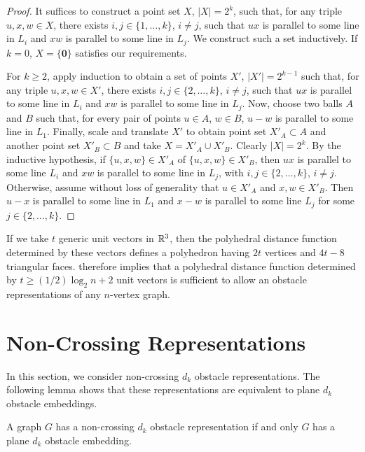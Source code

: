 \documentclass{patmorin}
\begin{document}
\begin{proof}
   It suffices to construct a point set $X$, $|X|=2^{k}$, such that,
   for any triple $u,x,w\in X$, there exists $i,j\in\{1,\ldots,k\}$,
   $i\neq j$, such that $ux$ is parallel to some line in $L_i$ and $xw$ is
   parallel to some line in $L_j$.  We construct such a set inductively.
   If $k=0$, $X=\{\textbf{0}\}$ satisfies our requirements.

   For $k\ge 2$, apply induction to obtain a set of points $X'$,
   $|X'|=2^{k-1}$ such that, for any triple $u,x,w\in X'$, there exists
   $i,j\in\{2,\ldots,k\}$, $i\neq j$, such that $ux$ is parallel to
   some line in $L_i$ and $xw$ is parallel to some line in $L_j$.  Now,
   choose two balls $A$ and $B$ such that, for every pair of points
   $u\in A$, $w\in B$, $u-w$ is parallel to some line in $L_{1}$.
   Finally, scale and translate $X'$ to obtain point set $X'_A\subset
   A$ and another point set $X'_B\subset B$ and take $X=X'_A\cup X'_B$.
   Clearly $|X|=2^k$.  By the inductive hypothesis, if $\{u,x,w\}\in X'_A$
   of $\{u,x,w\}\in X'_B$, then $ux$ is parallel to some line $L_i$ and
   $xw$ is parallel to some line in $L_j$, with $i,j\in\{2,\ldots,k\}$,
   $i\neq j$.  Otherwise, assume without loss of generality that $u\in
   X'_A$ and $x,w\in X'_B$.  Then $u-x$ is parallel to some line in $L_1$
   and $x-w$ is parallel to some line $L_j$ for some $j\in\{2,\ldots,k\}$.
\end{proof}

If we take $t$ generic unit vectors in $\mathbb{R}^3$, then the polyhedral
distance function determined by these vectors defines a polyhedron having
$2t$ vertices and $4t-8$ triangular faces.  
therefore implies that a polyhedral distance function determined by
$t\ge (1/2)\log_2 n +2$ unit vectors is sufficient to allow an obstacle
representations of any $n$-vertex graph.



\section{Non-Crossing Representations}

In this section, we consider non-crossing $d_k$ obstacle
representations. The following lemma shows that these representations
are equivalent to plane $d_k$ obstacle embeddings.

\begin{lem}
   A graph $G$ has a non-crossing $d_k$ obstacle representation if and
   only $G$ has a plane $d_k$ obstacle embedding.
\end{lem}
\end{document}
